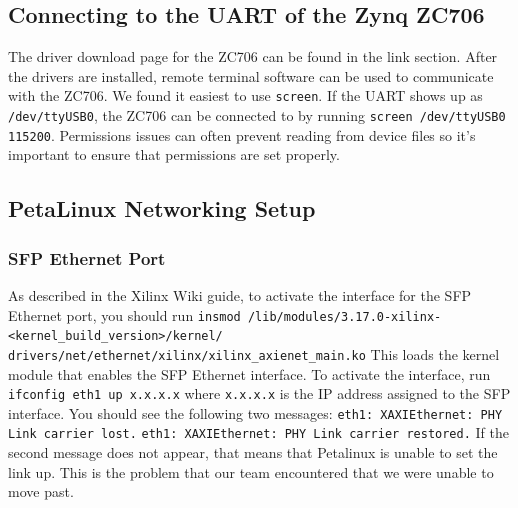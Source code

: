\documentclass[12pt]{report}
\begin{document}
\subsection{Connecting to the UART of the Zynq ZC706}
The driver download page for the ZC706 can be found in the link section. After the drivers are installed, remote terminal software can be used to communicate with the ZC706. We found it easiest to use \texttt{screen}. If the UART shows up as \texttt{/dev/ttyUSB0}, the ZC706 can be connected to by running \texttt{screen /dev/ttyUSB0 115200}. Permissions issues can often prevent reading from device files so it's important to ensure that permissions are set properly.

\subsection{PetaLinux Networking Setup}
\subsubsection{SFP Ethernet Port}
As described in the Xilinx Wiki guide, to activate the interface for the SFP Ethernet port, you should run
\newline \texttt{insmod /lib/modules/3.17.0-xilinx-<kernel\_build\_version>/kernel/}
\newline \texttt{drivers/net/ethernet/xilinx/xilinx\_axienet\_main.ko}
\newline This loads the kernel module that enables the SFP Ethernet interface.
\newline To activate the interface, run
\newline \texttt{ifconfig eth1 up x.x.x.x}
\newline where \texttt{x.x.x.x} is the IP address assigned to the SFP interface.
\newline You should see the following two messages:
\newline \texttt{eth1: XAXIEthernet: PHY Link carrier lost.}
\newline \texttt{eth1: XAXIEthernet: PHY Link carrier restored.}
\newline If the second message does not appear, that means that Petalinux is unable to set the link up. This is the problem that our team encountered that we were unable to move past.
\end{document}
